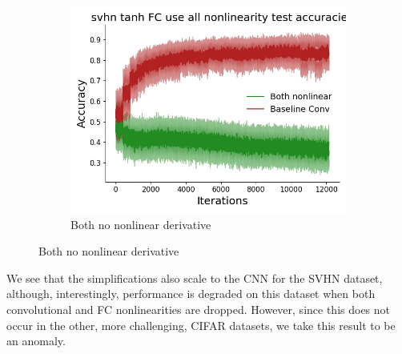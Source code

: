 \begin{figure}[htb]
\begin{subfigure}{0.25\textwidth}
  \includegraphics[width=\linewidth]{chapter_6_figures/AR/svhn_tanh_FC_use_all_nonlinearity_test_accuracies_prelim_1.jpg}
  \caption{Both no nonlinear derivative}
\end{subfigure}
\label{fig:images}
\end{figure}

We see that the simplifications also scale to the CNN for the SVHN dataset, although, interestingly, performance is degraded on this dataset when both convolutional and FC nonlinearities are dropped. However, since this does not occur in the other, more challenging, CIFAR datasets, we take this result to be an anomaly.


